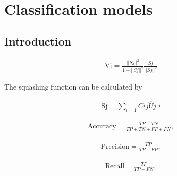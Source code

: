 \chapter{ Classification models} 
\label{classify}



\section{Introduction}

\begin{eqnarray}
\label{eq:acc}
			\mathrm{Vj} =  \frac {{||Sj||^2}  }  { {1} +{||Sj||^2 }}   \frac {{Sj}  }  { {||Sj||^2 }} 
\end{eqnarray}

The squashing function can be calculated by

\begin{eqnarray}
\label{eq:acc}
			\mathrm{Sj} = \sum\limits_{i=1} Cij \hat U j|i 
\end{eqnarray}
 

	
\begin{eqnarray}
\label{eq:acc}
			\mathrm{Accuracy} =  \frac {{TP} + { TN } }  { {TP} +{TN }  + {FP  } + {FN}} ,
\end{eqnarray}

\begin{eqnarray}
\label{eq:prec}
	\mathrm{Precision} =  \frac {TP } {{TP } + {FP} } , 
\end{eqnarray}

\begin{eqnarray}
\label{eq:recal}
	\mathrm{Recall} =  \frac {TP } {{TP} + {FN}} , 
\end{eqnarray}

